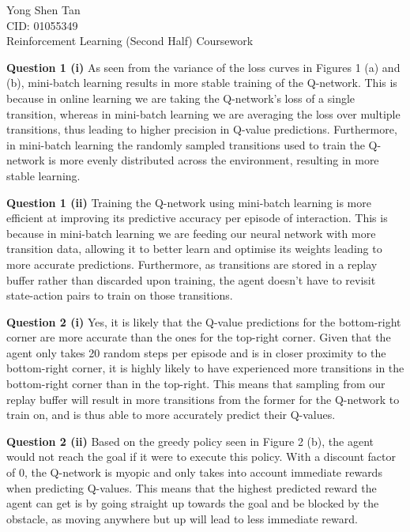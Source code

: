 \documentclass[12pt]{article}
\begin{document}
\begin{center}
    \huge{Yong Shen Tan}\\
    \vspace{0.3cm}
    \large{CID: 01055349}\\
    \vspace{0.3cm}
    \large{Reinforcement Learning (Second Half) Coursework}\\
    \vspace{0.3cm}
\end{center}

\vspace{1.5cm}

\textbf{Question 1 (i)}
As seen from the variance of the loss curves in Figures 1 (a) and (b), mini-batch learning results in more stable training of the Q-network. This is because in online learning we are taking the Q-network's loss of a single transition, whereas in mini-batch learning we are averaging the loss over multiple transitions, thus leading to higher precision in Q-value predictions. Furthermore, in mini-batch learning the randomly sampled transitions used to train the Q-network is more evenly distributed across the environment, resulting in more stable learning.
\vspace{0.5cm}

\textbf{Question 1 (ii)}
Training the Q-network using mini-batch learning is more efficient at improving its predictive accuracy per episode of interaction. This is because in mini-batch learning we are feeding our neural network with more transition data, allowing it to better learn and optimise its weights leading to more accurate predictions. Furthermore, as transitions are stored in a replay buffer rather than discarded upon training, the agent doesn't have to revisit state-action pairs to train on those transitions.

\vspace{2cm}
\textbf{Question 2 (i)}
Yes, it is likely that the Q-value predictions for the bottom-right corner are more accurate than the ones for the top-right corner. Given that the agent only takes 20 random steps per episode and is in closer proximity to the bottom-right corner, it is highly likely to have experienced more transitions in the bottom-right corner than in the top-right. This means that sampling from our replay buffer will result in more transitions from the former for the Q-network to train on, and is thus able to more accurately predict their Q-values.

\vspace{0.5cm}
\textbf{Question 2 (ii)}
Based on the greedy policy seen in Figure 2 (b), the agent would not reach the goal if it were to execute this policy. With a discount factor of 0, the Q-network is myopic and only takes into account immediate rewards when predicting Q-values. This means that the highest predicted reward the agent can get is by going straight up towards the goal and be blocked by the obstacle, as moving anywhere but up will lead to less immediate reward.
\end{document}
